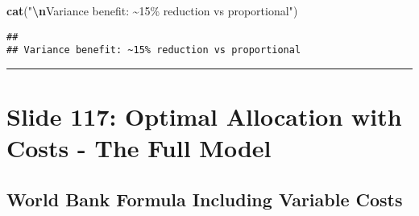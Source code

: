 \documentclass[
]{article}
\newenvironment{Shaded}{\begin{snugshade}}{\end{snugshade}}
\newcommand{\FunctionTok}[1]{\textcolor[rgb]{0.13,0.29,0.53}{\textbf{#1}}}
\newcommand{\NormalTok}[1]{#1}
\newcommand{\SpecialCharTok}[1]{\textcolor[rgb]{0.81,0.36,0.00}{\textbf{#1}}}
\newcommand{\StringTok}[1]{\textcolor[rgb]{0.31,0.60,0.02}{#1}}
\begin{document}
\begin{Shaded}
\begin{Highlighting}[]
\FunctionTok{cat}\NormalTok{(}\StringTok{"}\SpecialCharTok{\textbackslash{}n}\StringTok{Variance benefit: \textasciitilde{}15\% reduction vs proportional"}\NormalTok{)}
\end{Highlighting}
\end{Shaded}

\begin{verbatim}
## 
## Variance benefit: ~15% reduction vs proportional
\end{verbatim}

\begin{center}\rule{0.5\linewidth}{0.5pt}\end{center}

\section{Slide 117: Optimal Allocation with Costs - The Full
Model}\label{slide-117-optimal-allocation-with-costs---the-full-model}

\subsection{World Bank Formula Including Variable
Costs}\label{world-bank-formula-including-variable-costs}
\end{document}
